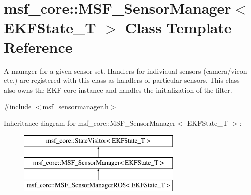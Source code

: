 \hypertarget{classmsf__core_1_1MSF__SensorManager}{\section{msf\-\_\-core\-:\-:M\-S\-F\-\_\-\-Sensor\-Manager$<$ E\-K\-F\-State\-\_\-\-T $>$ Class Template Reference}
\label{classmsf__core_1_1MSF__SensorManager}
}


A manager for a given sensor set. Handlers for individual sensors (camera/vicon etc.) are registered with this class as handlers of particular sensors. This class also owns the E\-K\-F core instance and handles the initialization of the filter.  




{\ttfamily \#include $<$msf\-\_\-sensormanager.\-h$>$}

Inheritance diagram for msf\-\_\-core\-:\-:M\-S\-F\-\_\-\-Sensor\-Manager$<$ E\-K\-F\-State\-\_\-\-T $>$\-:\begin{figure}[H]
\begin{center}
\leavevmode
\includegraphics[height=3.000000cm]{classmsf__core_1_1MSF__SensorManager}
\end{center}
\end{figure}
